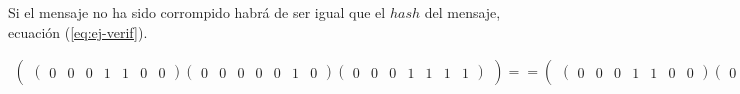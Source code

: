 Si el mensaje no ha sido corrompido habrá de ser igual que el $hash$ del mensaje, ecuación (\ref{eq:ej-verif}).

\begin{equation}\label{eq:ej-verif}
	\begin{aligned}
	\left(\begin{matrix}
		\left(\begin{smallmatrix}0 & 0 & 0 & 1 & 1 & 0 & 0\end{smallmatrix}\right)
		\left(\begin{smallmatrix}0 & 0 & 0 & 0 & 0 & 1 & 0\end{smallmatrix}\right)
		\left(\begin{smallmatrix}0 & 0 & 0 & 1 & 1 & 1 & 1\end{smallmatrix}\right)
	\end{matrix}\right)==\left(\begin{matrix}
		\left(\begin{smallmatrix}0 & 0 & 0 & 1 & 1 & 0 & 0\end{smallmatrix}\right)
		\left(\begin{smallmatrix}0 & 0 & 0 & 0 & 0 & 1 & 0\end{smallmatrix}\right)
		\left(\begin{smallmatrix}0 & 0 & 0 & 1 & 1 & 1 & 1\end{smallmatrix}\right)
	\end{matrix}\right)
	\end{aligned}
\end{equation}























